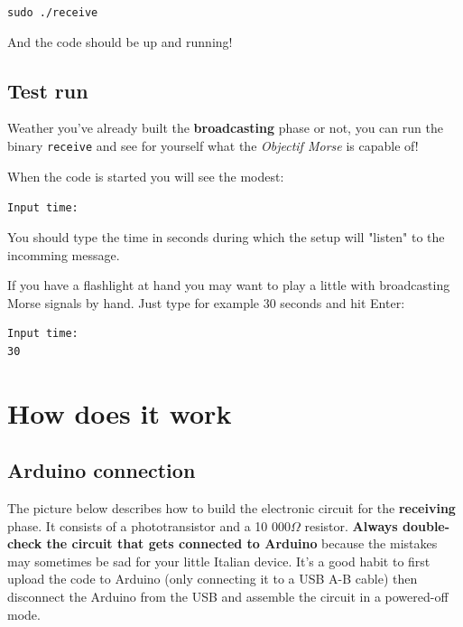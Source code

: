 \documentclass[12pt]{report}
\begin{document}
\begin{snugshade}
\verb|sudo ./receive|
\end{snugshade}

And the code should be up and running!

\subsection{Test run}

Weather you've already built the \textbf{broadcasting} phase or not, you can run the binary \verb|receive| and see for yourself what the \textit{Objectif Morse} is capable of!

When the code is started you will see the modest:

\begin{snugshade}
\verb|Input time:|
\end{snugshade}

You should type the time in seconds during which the setup will "listen" to the incomming message.

If you have a flashlight at hand you may want to play a little with broadcasting Morse signals by hand. Just type for example 30 seconds and hit Enter:

\begin{snugshade}
\begin{verbatim}
Input time:
30
\end{verbatim}
\end{snugshade}


\section{How does it work}





\subsection{Arduino connection}

The picture below describes how to build the electronic circuit for the \textbf{receiving} phase. It consists of a phototransistor and a 10 000$\Omega$ resistor. \textbf{Always double-check the circuit that gets connected to Arduino} because the mistakes may sometimes be sad for your little Italian device. It's a good habit to first upload the code to Arduino (only connecting it to a USB A-B cable) then disconnect the Arduino from the USB and assemble the circuit in a powered-off mode.
\end{document}
